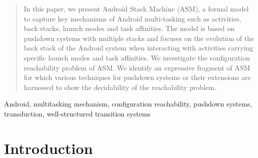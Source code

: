 \documentclass[preprint,12pt]{elsarticle}
\begin{document}
\begin{frontmatter}





 
\begin{abstract}
In this paper, we present Android Stack Machine (ASM), a formal model to capture key mechanisms of Android multi-tasking such as activities, back stacks, launch modes and task affinities. The model is based on pushdown systems with multiple stacks and focuses on the evolution of the back stack of the Android system when interacting with activities carrying specific launch modes and task affinities. We investigate the configuration reachability problem of ASM. %
We identify an expressive fragment of ASM for which various techniques for pushdown systems or their extensions are harnessed to show the decidability of the reachability problem.
\end{abstract}



\begin{keyword}
Android, multitasking mechanism, %
configuration reachability, pushdown systems, %
transduction, %
well-structured transition systems
\end{keyword}
\end{frontmatter}



\section{Introduction} \label{sec:intro}


\end{document}
